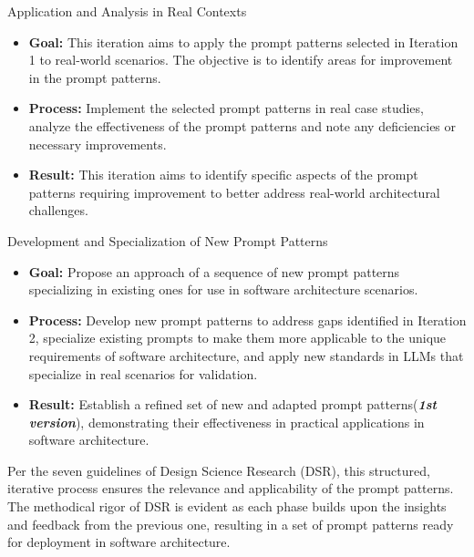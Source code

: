  Application and Analysis in Real Contexts
\begin{itemize}
    \item \textbf{Goal:} This iteration aims to apply the prompt patterns selected in Iteration 1 to real-world scenarios. The objective is to identify areas for improvement in the prompt patterns.
    \item \textbf{Process:} Implement the selected prompt patterns in real case studies, analyze the effectiveness of the prompt patterns and note any deficiencies or necessary improvements.            
    \item \textbf{Result:} This iteration aims to identify specific aspects of the prompt patterns requiring improvement to better address real-world architectural challenges.
\end{itemize}

 Development and Specialization of New Prompt Patterns
\begin{itemize}
    \item \textbf{Goal:} Propose an approach of a sequence of new prompt patterns specializing in existing ones for use in software architecture scenarios.
    \item \textbf{Process:} Develop new prompt patterns to address gaps identified in Iteration 2, specialize existing prompts to make them more applicable to the unique requirements of software architecture, and apply new standards in LLMs that specialize in real scenarios for validation.        
    \item \textbf{Result:}  Establish a refined set of new and adapted prompt patterns(\textit{\textbf{1st version}}), demonstrating their effectiveness in practical applications in software architecture.
\end{itemize}

Per the seven guidelines of Design Science Research (DSR), this structured, iterative process ensures the relevance and applicability of the prompt patterns. The methodical rigor of DSR is evident as each phase builds upon the insights and feedback from the previous one, resulting in a set of prompt patterns ready for deployment in software architecture.


